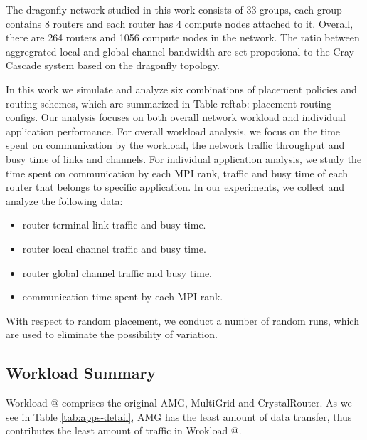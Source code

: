 \documentclass[conference,compsoc]{IEEEtran}
\makeatletter
\newcommand{\Rmnum}[1]{\expandafter\@slowromancap\romannumeral #1@}
\makeatother
\begin{document}
The dragonfly network studied in this work consists of 33 groups, each group contains 8 routers and each router has 4 compute nodes attached to it. Overall, there are 264 routers and 1056 compute nodes in the network. The ratio between aggregrated local and global channel bandwidth are set propotional to the Cray Cascade system\cite{faanes} based on the dragonfly topology\cite{dally-dragonfly}.

In this work we simulate and analyze six combinations of placement policies and routing schemes, which are summarized in Table ref{tab: placement routing configs}. Our analysis focuses on both overall network workload and individual application performance. For overall workload analysis, we focus on the time spent on communication by the workload, the network traffic throughput and busy time of links and channels. For individual application analysis, we study the time spent on communication by each MPI rank, traffic and busy time of each router that belongs to specific application. In our experiments, we collect and analyze the following data: 

\begin{itemize}
    \item router terminal link traffic and busy time.
    \item router local channel traffic and busy time.
    \item router global channel traffic and busy time.
    \item communication time spent by each MPI rank. 
\end{itemize}

With respect to random placement, we conduct a number of random runs, which are used to eliminate the possibility of variation.

%
\subsection{Workload Summary}
\label{sec:workload summary}

Workload \Rmnum{1} comprises the original AMG, MultiGrid and CrystalRouter. As we see in Table \ref{tab:apps-detail}, AMG has the least amount of data transfer, thus contributes the least amount of traffic in Wrokload \Rmnum{1}.
\end{document}
